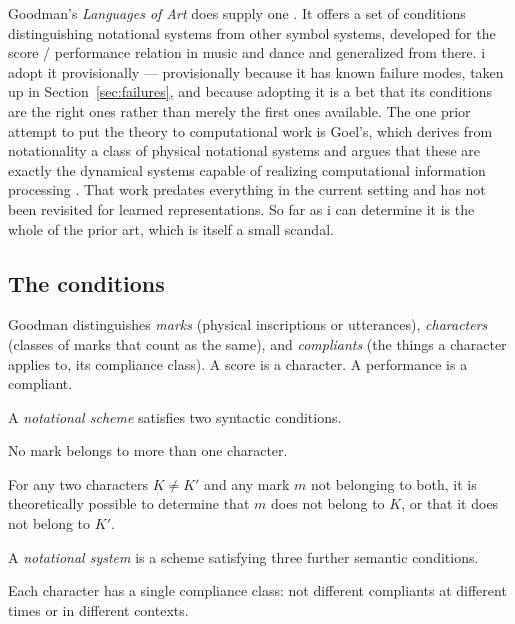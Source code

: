 Goodman's \emph{Languages of Art} does supply one
\cite{goodman1968}.
It offers a set of conditions distinguishing notational systems
from other symbol systems, developed for the score / performance
relation in music and dance and generalized from there.
i adopt it provisionally --- provisionally because it has known
failure modes, taken up in Section~\ref{sec:failures}, and because
adopting it is a bet that its conditions are the right ones rather
than merely the first ones available.
The one prior attempt to put the theory to computational work is
Goel's, which derives from notationality a class of physical
notational systems and argues that these are exactly the dynamical
systems capable of realizing computational information processing
\cite{goel1991}.
That work predates everything in the current setting and has not
been revisited for learned representations.
So far as i can determine it is the whole of the prior art, which
is itself a small scandal.

\subsection{The conditions}
\label{sec:conditions}

Goodman distinguishes \emph{marks} (physical inscriptions or
utterances), \emph{characters} (classes of marks that count as the
same), and \emph{compliants} (the things a character applies to,
its compliance class).
A score is a character.
A performance is a compliant.

A \emph{notational scheme} satisfies two syntactic conditions.

\begin{condition}
\label{cond:sd}
No mark belongs to more than one character.
\end{condition}

\begin{condition}
\label{cond:sfd}
For any two characters $K \neq K'$ and any mark $m$ not belonging
to both, it is theoretically possible to determine that $m$ does
not belong to $K$, or that it does not belong to $K'$.
\end{condition}

\noindent
A \emph{notational system} is a scheme satisfying three further
semantic conditions.

\begin{condition}[Unambiguity]
\label{cond:ua}
Each character has a single compliance class: not different
compliants at different times or in different contexts.
\end{condition}

